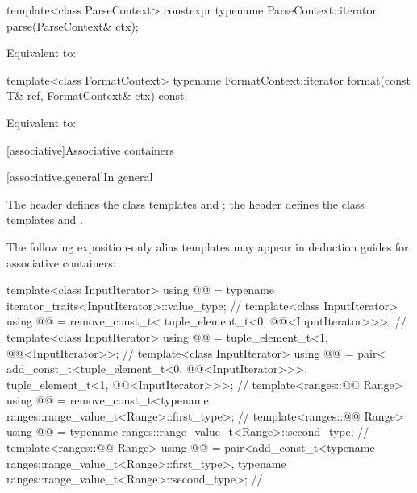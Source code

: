 %
\begin{itemdecl}
template<class ParseContext>
  constexpr typename ParseContext::iterator
    parse(ParseContext& ctx);
\end{itemdecl}

\begin{itemdescr}
\pnum
Equivalent to: 
\end{itemdescr}

%
\begin{itemdecl}
template<class FormatContext>
  typename FormatContext::iterator
    format(const T& ref, FormatContext& ctx) const;
\end{itemdecl}

\begin{itemdescr}
\pnum
Equivalent to: 
\end{itemdescr}

[associative]{Associative containers}

[associative.general]{In general}

\pnum
The header  defines the class templates  and
; the header  defines the class templates
 and .

\pnum
The following exposition-only alias templates may appear in deduction guides for associative containers:
\begin{codeblock}
template<class InputIterator>
  using @@ =
    typename iterator_traits<InputIterator>::value_type;                // \expos
template<class InputIterator>
  using @@ = remove_const_t<
    tuple_element_t<0, @@<InputIterator>>>;                // \expos
template<class InputIterator>
  using @@ =
    tuple_element_t<1, @@<InputIterator>>;                 // \expos
template<class InputIterator>
  using @@ = pair<
    add_const_t<tuple_element_t<0, @@<InputIterator>>>,
    tuple_element_t<1, @@<InputIterator>>>;                // \expos
template<ranges::@@ Range>
  using @@ =
    remove_const_t<typename ranges::range_value_t<Range>::first_type>;  // \expos
template<ranges::@@ Range>
  using @@ = typename ranges::range_value_t<Range>::second_type; // \expos
template<ranges::@@ Range>
  using @@ =
    pair<add_const_t<typename ranges::range_value_t<Range>::first_type>,
         typename ranges::range_value_t<Range>::second_type>;           // \expos
\end{codeblock}

